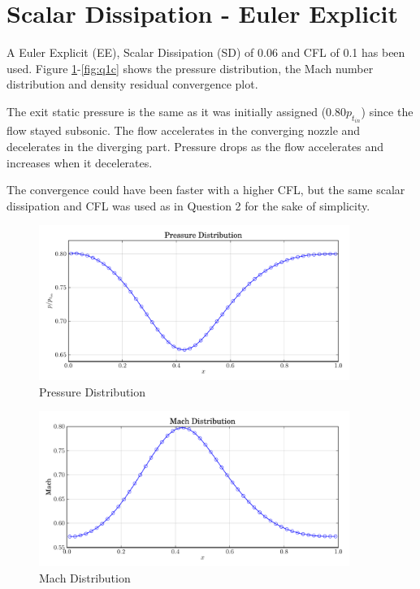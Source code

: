 \documentclass[letterpaper,12pt,]{article}
\begin{document}


\section{Scalar Dissipation - Euler Explicit}

A Euler Explicit (EE), Scalar Dissipation (SD) of 0.06 and CFL of 0.1 has been used.
Figure \ref{fig:q1p}-\ref{fig:q1c} shows the pressure distribution, the Mach number distribution and density residual convergence plot.

The exit static pressure is the same as it was initially assigned ($0.80p_{t_{in}}$) since the flow stayed subsonic. The flow accelerates in the converging nozzle and decelerates in the diverging part. Pressure drops as the flow accelerates and increases when it decelerates.

The convergence could have been faster with a higher CFL, but the same scalar dissipation and CFL was used as in Question 2 for the sake of simplicity.

\begin{figure}[!ht]
    \centering
    \includegraphics[width = 0.9\textwidth]{./figures/q1p.pdf}
    \caption {Pressure Distribution}
    \label{fig:q1p}
\end{figure}

\begin{figure}[!ht]
    \centering
    \includegraphics[width = 0.9\textwidth]{./figures/q1m.pdf}
    \caption {Mach Distribution}
    \label{fig:q1m}
\end{figure}
\end{document}
